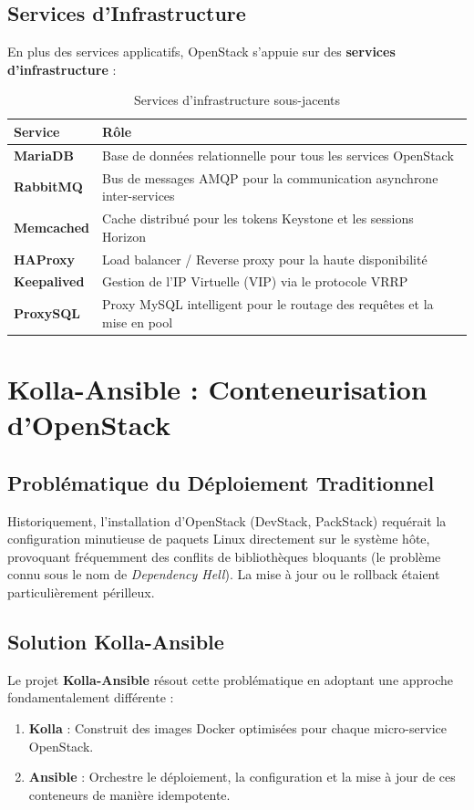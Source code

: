\documentclass[12pt,a4paper,oneside]{book}
\begin{document}
\subsection{Services d'Infrastructure}
En plus des services applicatifs, OpenStack s'appuie sur des \textbf{services d'infrastructure} :

\begin{table}[H]
\centering
\caption{Services d'infrastructure sous-jacents}
\begin{tabularx}{\textwidth}{|l|X|}
\hline
\textbf{Service} & \textbf{R\^ole} \\
\hline
\textbf{MariaDB} & Base de donn\'ees relationnelle pour tous les services OpenStack \\
\hline
\textbf{RabbitMQ} & Bus de messages AMQP pour la communication asynchrone inter-services \\
\hline
\textbf{Memcached} & Cache distribu\'e pour les tokens Keystone et les sessions Horizon \\
\hline
\textbf{HAProxy} & Load balancer / Reverse proxy pour la haute disponibilit\'e \\
\hline
\textbf{Keepalived} & Gestion de l'IP Virtuelle (VIP) via le protocole VRRP \\
\hline
\textbf{ProxySQL} & Proxy MySQL intelligent pour le routage des requ\^etes et la mise en pool \\
\hline
\end{tabularx}
\label{tab:infra_services}
\end{table}

\section{Kolla-Ansible : Conteneurisation d'OpenStack}

\subsection{Probl\'ematique du D\'eploiement Traditionnel}
Historiquement, l'installation d'OpenStack (DevStack, PackStack) requ\'erait la configuration minutieuse de paquets Linux directement sur le syst\`eme h\^ote, provoquant fr\'equemment des conflits de biblioth\`eques bloquants (le probl\`eme connu sous le nom de \textit{Dependency Hell}). La mise \`a jour ou le rollback \'etaient particuli\`erement p\'erilleux.

\subsection{Solution Kolla-Ansible}
Le projet \textbf{Kolla-Ansible} r\'esout cette probl\'ematique en adoptant une approche fondamentalement diff\'erente :
\begin{enumerate}
    \item \textbf{Kolla} : Construit des images Docker optimis\'ees pour chaque micro-service OpenStack.
    \item \textbf{Ansible} : Orchestre le d\'eploiement, la configuration et la mise \`a jour de ces conteneurs de mani\`ere idempotente.
\end{enumerate}
\end{document}
